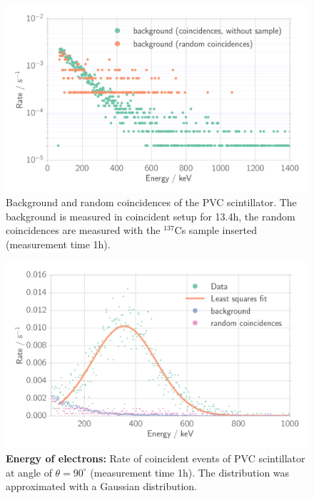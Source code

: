 \begin{figure}[htpb]
    \centering
    \includegraphics[width=0.9\linewidth]{./analysis/figures/coin_background_random}
    \caption{Background and random coincidences of the PVC scintillator. 
        The background is measured in coincident setup for 13.4h, the random coincidences are 
    measured with the $^{137}$Cs sample inserted (measurement time 1h).}
\label{fig:coin_ps_background}
\end{figure}

\begin{figure}[htpb]
    \centering
    \includegraphics[width=0.9\linewidth]{./analysis/figures/coin_ps_90}
    \caption{\textbf{Energy of electrons:}
    Rate of coincident events of PVC scintillator at angle of $\theta = 90^\circ$ 
        (measurement time 1h). The distribution 
    was approximated with a Gaussian distribution. }
\label{fig:coin_ps_90}
\end{figure}

